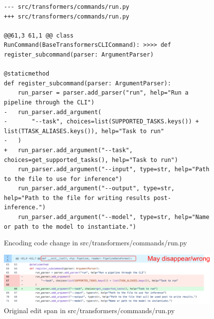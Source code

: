 \begin{figure}[h]
\scriptsize
\begin{verbatim}
--- src/transformers/commands/run.py
+++ src/transformers/commands/run.py

@@61,3 61,1 @@ class RunCommand(BaseTransformersCLICommand): >>>> def register_subcommand(parser: ArgumentParser)

@staticmethod
def register_subcommand(parser: ArgumentParser):
    run_parser = parser.add_parser("run", help="Run a pipeline through the CLI")
-   run_parser.add_argument(
-       "--task", choices=list(SUPPORTED_TASKS.keys()) + list(TTASK_ALIASES.keys()), help="Task to run"
-   )
+   run_parser.add_argument("--task", choices=get_supported_tasks(), help="Task to run")
    run_parser.add_argument("--input", type=str, help="Path to the file to use for inference")
    run_parser.add_argument("--output", type=str, help="Path to the file for writing results post-inference.")
    run_parser.add_argument("--model", type=str, help="Name or path to the model to instantiate.")
\end{verbatim}
\caption{Encoding code change in src/transformers/commands/run.py}
\label{code:encoded_code_change}
\end{figure}

\begin{figure}
    \centering
    \includegraphics[width=1\linewidth]{fig/encode.png}
    \caption{Original edit span in src/transformers/commands/run.py}
    \label{fig:original_code_change}
\end{figure}



